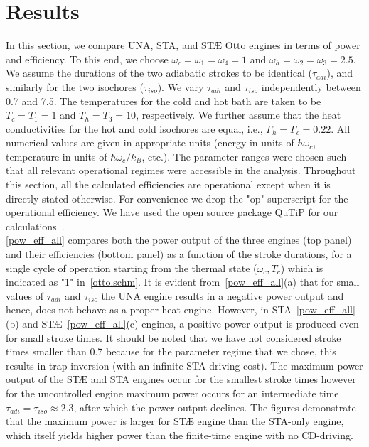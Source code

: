 \documentclass[aps,pra,twocolumn,showpacs,showkeys,groupedaddress,nobalancelastpage,nofootinbib,floatfix,superscriptaddress,longbibliography]{revtex4-2}
\begin{document}
\section{Results}
\label{sec:result}
In this section, we compare UNA, STA, and ST{{\AE}} Otto engines in terms of power and efficiency. To this end, we choose $\omega_c = \omega_1 = \omega_4 = 1$ and $\omega_h = \omega_2 = \omega_3 = 2.5$. We assume the durations of the two adiabatic strokes to be identical ($\tau_{adi}$), and similarly for the two isochores ($\tau_{iso}$). We vary $\tau_{adi}$ and $\tau_{iso}$ independently between 0.7 and 7.5. The temperatures for the cold and hot bath are taken to be $T_c=T_1=1$ and $T_h=T_3=10$, respectively. We further assume that the heat conductivities for the hot and cold isochores are equal, i.e.,  $\Gamma_h=\Gamma_c=0.22$. All numerical values are given in appropriate units (energy in units of $\hbar\omega_c$, temperature in units of $\hbar\omega_c/k_B$, etc.). The parameter ranges were chosen such that all relevant operational regimes were accessible in the analysis. Throughout this section, all the calculated efficiencies are operational except when it is directly stated otherwise. For convenience we drop the "op" superscript for the operational efficiency. We have used the open source package QuTiP for our calculations~\cite{qutip}.\\

\cref{pow_eff_all} compares both the power output of the three engines (top panel) and their efficiencies (bottom panel) as a function of the stroke durations, for a single cycle of operation starting from the thermal state ($\omega_c,T_c$) which is indicated as "1" in~\cref{otto.schm}. It is evident from~\cref{pow_eff_all}(a) that for small values of $\tau_{adi}$ and $\tau_{iso}$ the UNA engine results in a negative power output and hence, does not behave as a proper heat engine. However, in STA~\cref{pow_eff_all}(b) and ST{\AE}~\cref{pow_eff_all}(c) engines, a positive power output is produced even for small stroke times. It should be noted that we have not considered stroke times smaller than 0.7 because for the parameter regime that we chose, this results in trap inversion (with an infinite STA driving cost). The maximum power output of the ST{\AE} and STA engines occur for the smallest stroke times however for the uncontrolled engine maximum power occurs for an intermediate time $\tau_{adi}=\tau_{iso}\approx 2.3$, after which the power output declines. The figures demonstrate that the maximum power is larger for ST{\AE} engine than the STA-only engine, which itself yields higher power than the finite-time engine with no CD-driving. 
\end{document}
